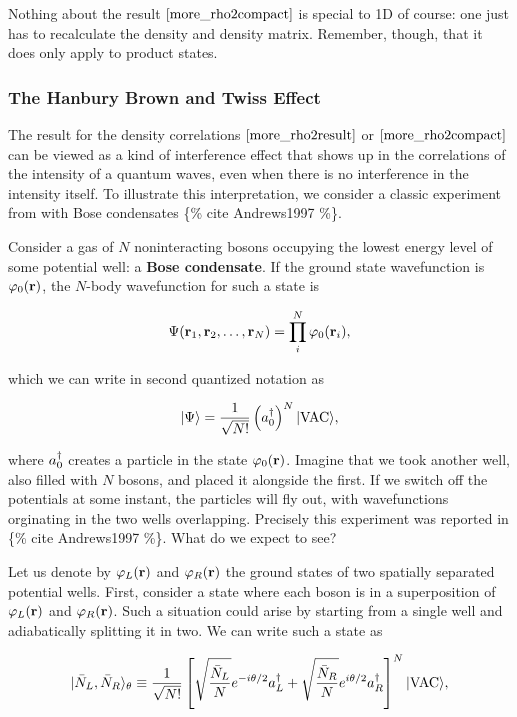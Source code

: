 Nothing about the result \(\eqref{more_rho2compact}\) is special to 1D
of course: one just has to recalculate the density and density matrix.
Remember, though, that it does only apply to product states.

\hypertarget{the-hanbury-brown-and-twiss-effect}{%
\subsubsection{The Hanbury Brown and Twiss
Effect}\label{the-hanbury-brown-and-twiss-effect}}

The result for the density correlations \(\eqref{more_rho2result}\) or
\(\eqref{more_rho2compact}\) can be viewed as a kind of interference
effect that shows up in the correlations of the intensity of a quantum
waves, even when there is no interference in the intensity itself. To
illustrate this interpretation, we consider a classic experiment from
with Bose condensates \{\% cite Andrews1997 \%\}.

Consider a gas of \(N\) noninteracting bosons occupying the lowest
energy level of some potential well: a \textbf{Bose condensate}. If the
ground state wavefunction is \(\varphi_{0}(\mathbf{r})\), the \(N\)-body
wavefunction for such a state is

\[
    \Psi(\mathbf{r}_1,\mathbf{r}_2,\ldots,\mathbf{r}_N)=\prod_i^N \varphi_0(\mathbf{r}_i),
  \label{2nd_quant_BoseGroundState}
\]

which we can write in second quantized notation as

\[
    \lvert{\Psi}\rangle=\frac{1}{\sqrt{N!}}\left(a^\dagger_0\right)^N\lvert{\text{VAC}}\rangle,
\]

where \(a^\dagger_0\) creates a particle in the state \(\varphi_0(\mathbf{r})\).
Imagine that we took another well, also filled with \(N\) bosons, and
placed it alongside the first. If we switch off the potentials at some
instant, the particles will fly out, with wavefunctions orginating in
the two wells overlapping. Precisely this experiment was reported in
\{\% cite Andrews1997 \%\}. What do we expect to see?

Let us denote by \(\varphi_L(\mathbf{r})\) and \(\varphi_R(\mathbf{r})\) the ground
states of two spatially separated potential wells. First, consider a
state where each boson is in a superposition of \(\varphi_L(\mathbf{r})\) and
\(\varphi_R(\mathbf{r})\). Such a situation could arise by starting from a
single well and adiabatically splitting it in two. We can write such a
state as

\[
    \lvert{\bar N_L,\bar N_R}\rangle_\theta\equiv\frac{1}{\sqrt{N!}}\left[\sqrt{\frac{\bar N_L}{N}}e^{-i\theta/2}
    a^\dagger_L+\sqrt{\frac{\bar N_R}{N}}e^{i\theta/2}a^\dagger_R\right]^N\lvert{\text{VAC}}\rangle,
  \label{more_two}
\]

